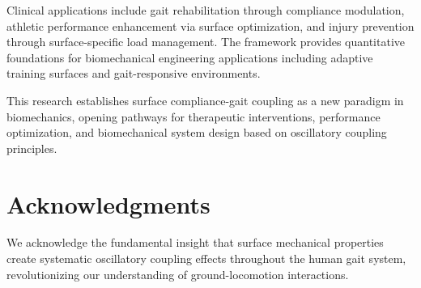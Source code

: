 \documentclass[12pt]{article}
\begin{document}
Clinical applications include gait rehabilitation through compliance modulation, athletic performance enhancement via surface optimization, and injury prevention through surface-specific load management. The framework provides quantitative foundations for biomechanical engineering applications including adaptive training surfaces and gait-responsive environments.

This research establishes surface compliance-gait coupling as a new paradigm in biomechanics, opening pathways for therapeutic interventions, performance optimization, and biomechanical system design based on oscillatory coupling principles.

\section*{Acknowledgments}

We acknowledge the fundamental insight that surface mechanical properties create systematic oscillatory coupling effects throughout the human gait system, revolutionizing our understanding of ground-locomotion interactions.



\end{document}
